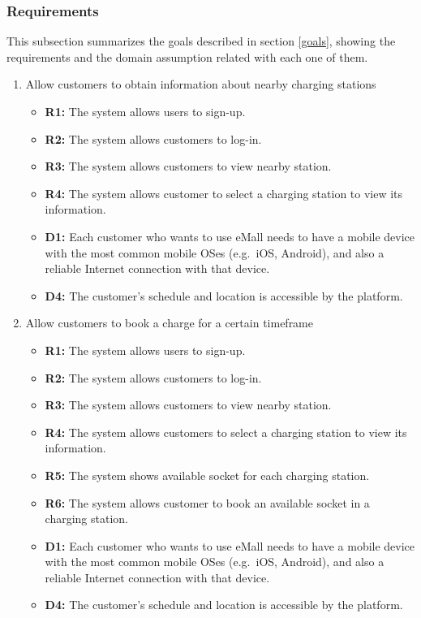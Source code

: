 \subsubsection{Requirements}
This subsection summarizes the goals described in section \ref{goals}, showing the requirements and the domain assumption related with each one of them.
\begin{enumerate}[label=\textbf{-G\arabic*}:]
    \item {Allow customers to obtain information about nearby charging stations
          \begin{itemize}
            \item \textbf{R1:} The system allows users to sign-up.
            \item \textbf{R2:} The system allows customers to log-in.
            \item \textbf{R3:} The system allows customers to view nearby station.
            \item \textbf{R4:} The system allows customer to select a charging station to view its information.
            \item \textbf{D1:} Each customer who wants to use eMall needs to have a mobile device with the most common mobile OSes (e.g.\ iOS, Android), and also a reliable Internet connection with that device.
            \item \textbf{D4:} The customer's schedule and location is accessible by the platform.
          \end{itemize}
          }
    \item {Allow customers to book a charge for a certain timeframe
          \begin{itemize}
            \item \textbf{R1:} The system allows users to sign-up.
            \item \textbf{R2:} The system allows customers to log-in.
            \item \textbf{R3:} The system allows customers to view nearby station.  
            \item \textbf{R4:} The system allows customers to select a charging station to view its information.
            \item \textbf{R5:} The system shows available socket for each charging station.
            \item \textbf{R6:} The system allows customer to book an available socket in a charging station.
            \item \textbf{D1:} Each customer who wants to use eMall needs to have a mobile device with the most common mobile OSes (e.g.\ iOS, Android), and also a reliable Internet connection with that device.
            \item \textbf{D4:} The customer's schedule and location is accessible by the platform.
                            

\end{itemize}}
\end{enumerate}
